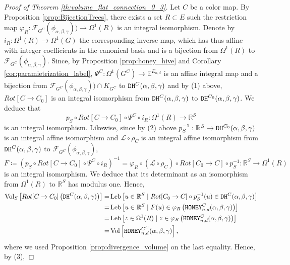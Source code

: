 \documentclass[11pt,a4paper]{amsart}
\providecommand{\R}{\mathbb R}
\providecommand{\Vol}{\operatorname{Vol}}
\providecommand{\Leb}{\operatorname{Leb}}
\providecommand{\honey}{\texttt{\textsc{HONEY}}}
\providecommand{\dualhive}{\texttt{\textsc{DH}}}
\numberwithin{equation}{section}
\theoremstyle{definition}
\begin{document}
\begin{proof}[Proof of Theorem \ref{th:volume_flat_connection_0_3}] 
Let $C$ be a color map. By Proposition \ref{prop:BijectionTrees}, 
there exists a set $R \subset E$ such the restriction map $\varphi_{R} : 
\mathcal{F}_{G^C}(\phi_{\alpha,\beta,\gamma}))\rightarrow \Omega^1(R)$
 is an integral isomorphism. 
Denote by $i_{R}:\Omega^1(R)\rightarrow \Omega^1(G)$ the corresponding inverse map, 
which has thus affine with integer coefficients in the canonical basis 
and is a bijection from $\Omega^1(R)$ to $\mathcal{F}_{G^C}(\phi_{\alpha,\beta,\gamma})$. 
Since, by Proposition \ref{prop:honey_hive} and Corollary \ref{cor:paramietrization_label}, 
$\Psi^C:\Omega^1(G^C)\rightarrow \mathbb{E}^{E_{n,d}}$ is an affine integral map 
and a bijection from $\mathcal{F}_{G^C}(\phi_{\alpha,\beta,\gamma}))\cap K_{G^C}$ to $\dualhive^C
(\alpha,\beta,\gamma)$ and by (1) above, $Rot[C\rightarrow C_0]$ is an integral isomorphism from $\dualhive^C(\alpha,\beta,\gamma)$ 
to $\dualhive^{C_0}(\alpha,\beta,\gamma)$. We deduce that 
$$p_{S}\circ Rot[C\rightarrow C_0]\circ \Psi^C\circ i_R: \Omega^1(R) \rightarrow \R^S$$
is an integral isomorphism. 
Likewise, since by (2) above $p_S^{-1}:\mathbb{R}^S\rightarrow 
\dualhive^{C_0}(\alpha,\beta,\gamma)$ 
is an integral affine isomorphism and $\mathcal{L} \circ \rho_{C}$ is an 
integral affine isomorphism from 
$\dualhive^{C}(\alpha,\beta,\gamma)$ to $\mathcal{F}_{G^{C}}(\phi_{\alpha,\beta,\gamma})$,
$$ F \coloneqq \left(p_{S}\circ Rot[C\rightarrow C_0]\circ \Psi^C\circ i_R \right)^{-1} 
= \varphi_{R}\circ (\mathcal{L} \circ \rho_{C}) 
\circ Rot[C_0\rightarrow C] \circ p_S^{-1}: \mathbb{R}^S\rightarrow \Omega^1(R)$$
is an integral isomorphism. We deduce that  
its determinant as an isomorphism from $\Omega^1(R)$ to $\R^S$ has modulus one.
Hence,
\begin{align*}
\Vol_S\left[Rot[C\rightarrow C_0] \left(\dualhive^C(\alpha,\beta,\gamma)\right) \right] = 
& \Leb \left[u\in\mathbb{R}^S \mid Rot[C_0\rightarrow C]\circ p_{S}^{-1}(u) 
\in \dualhive^C(\alpha,\beta,\gamma) \right]
\\
=& \Leb\left[u\in\mathbb{R}^S \mid F(u) 
\in \varphi_R \left(\honey_{n,d}^C(\alpha,\beta,\gamma)\right) \right]\\
=& \Leb\left[z\in\Omega^1(R) \mid z\in \varphi_R\left(\honey_{n,d}^C(\alpha,\beta,\gamma)\right) \right]\\
=& \Vol \left[\honey_{n,d}^{G^C}(\alpha,\beta,\gamma)\right],
\end{align*}
where we used Proposition \ref{prop:divergence_volume} on the last equality. Hence, by (3),

\end{proof}
\end{document}
